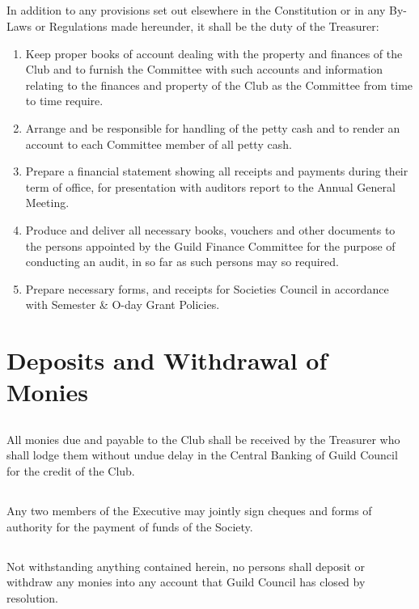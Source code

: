 \documentclass[10.5pt]{article}
\begin{document}
\subsection{} In addition to any provisions set out elsewhere in the Constitution or in any By-Laws or Regulations made hereunder, it shall be the duty of the Treasurer: 
\begin{enumerate}[label=(\alph*)]
    \item Keep proper books of account dealing with the property and finances of the Club and to furnish the Committee with such accounts and information relating to the finances and property of the Club as the Committee from time to time require. 
    \item Arrange and be responsible for handling of the petty cash and to render an account to each Committee member of all petty cash. 
    \item Prepare a financial statement showing all receipts and payments during their term of office, for presentation with auditors report to the Annual General Meeting. 
    \item Produce and deliver all necessary books, vouchers and other documents to the persons appointed by the Guild Finance Committee for the purpose of conducting an audit, in so far as such persons may so required. 
    \item Prepare necessary forms, and receipts for Societies Council in accordance with Semester \& O-day Grant Policies.
    \newline
\end{enumerate}


\section{Deposits and Withdrawal of Monies}
\subsection{} All monies due and payable to the Club shall be received by the Treasurer who shall lodge them without undue delay in the Central Banking of Guild Council for the credit of the Club. 
\subsection{} Any two members of the Executive may jointly sign cheques and forms of authority for the payment of funds of the Society. 
\subsection{} Not withstanding anything contained herein, no persons shall deposit or withdraw any monies into any account that Guild Council has closed by resolution.
\newline
\end{document}
